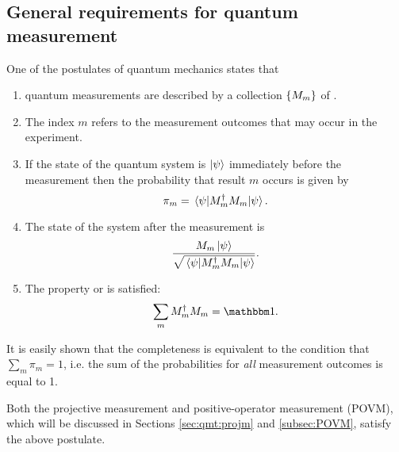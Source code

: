 \subsection{General requirements for quantum measurement}\label{sec:qmt:postulate}

One of the postulates of quantum mechanics \parencite[.3]{NielsenChuang}
states that
\begin{enumerate}
  \item
    quantum measurements are described by a collection
    $\left\{M_m\right\}$ of .
  \item
    The index $m$ refers to the measurement outcomes that
    may occur in the experiment.
  \item
    If the state of the quantum system is $\ket{\psi}$
    immediately before the measurement then the probability that result $m$ occurs is
    given by
    \begin{equation}\label{eq:qmt:postulate:prob}
      \pi_{m} = \ev{M^{\dagger}_{m} M_{m}}{\psi} \text{.}
    \end{equation}
  \item
    The state of the system after the measurement is
    \begin{equation}\label{eq:qmt:postulate:after}
      \frac{ M_m \ket{\psi} }{ \sqrt{\ev{M^{\dagger}_{m} M_{m}}{\psi}} } \text{.}
    \end{equation}
  \item
    The  property or  is satisfied:
    \begin{equation}\label{eq:qmt:postulate:completeness}
      \sum_m M_m^{\dagger} M_m = \idop \text{.}
    \end{equation}
\end{enumerate}

It is easily shown that the completeness is equivalent to the condition that
$\sum_m \pi_m = 1$, i.e. the sum of the probabilities for \emph{all} measurement outcomes is equal to 1.

Both the projective measurement and positive-operator measurement (POVM),
which will be discussed in Sections \ref{sec:qmt:projm} and \ref{subsec:POVM},
satisfy the above postulate.